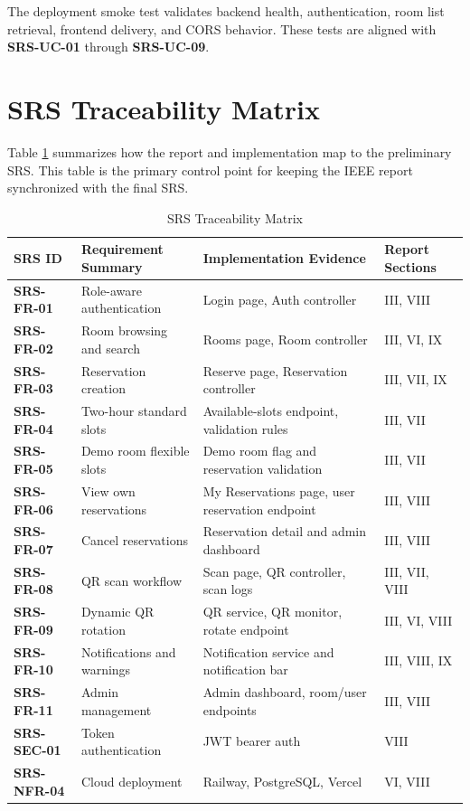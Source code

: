 \documentclass[conference]{IEEEtran}
\newcommand{\srs}[1]{\textbf{#1}}
\begin{document}
The deployment smoke test validates backend health, authentication, room list
retrieval, frontend delivery, and CORS behavior. These tests are aligned with
\srs{SRS-UC-01} through \srs{SRS-UC-09}.

\section{SRS Traceability Matrix}
Table \ref{tab:traceability} summarizes how the report and implementation map
to the preliminary SRS. This table is the primary control point for keeping
the IEEE report synchronized with the final SRS.

\begin{table}[htbp]
\caption{SRS Traceability Matrix}
\label{tab:traceability}
\centering
\begin{tabularx}{\textwidth}{@{}lXlX@{}}
\toprule
\textbf{SRS ID} & \textbf{Requirement Summary} & \textbf{Implementation Evidence} & \textbf{Report Sections} \\
\midrule
\srs{SRS-FR-01} & Role-aware authentication & Login page, Auth controller & III, VIII \\
\srs{SRS-FR-02} & Room browsing and search & Rooms page, Room controller & III, VI, IX \\
\srs{SRS-FR-03} & Reservation creation & Reserve page, Reservation controller & III, VII, IX \\
\srs{SRS-FR-04} & Two-hour standard slots & Available-slots endpoint, validation rules & III, VII \\
\srs{SRS-FR-05} & Demo room flexible slots & Demo room flag and reservation validation & III, VII \\
\srs{SRS-FR-06} & View own reservations & My Reservations page, user reservation endpoint & III, VIII \\
\srs{SRS-FR-07} & Cancel reservations & Reservation detail and admin dashboard & III, VIII \\
\srs{SRS-FR-08} & QR scan workflow & Scan page, QR controller, scan logs & III, VII, VIII \\
\srs{SRS-FR-09} & Dynamic QR rotation & QR service, QR monitor, rotate endpoint & III, VI, VIII \\
\srs{SRS-FR-10} & Notifications and warnings & Notification service and notification bar & III, VIII, IX \\
\srs{SRS-FR-11} & Admin management & Admin dashboard, room/user endpoints & III, VIII \\
\srs{SRS-SEC-01} & Token authentication & JWT bearer auth & VIII \\
\srs{SRS-NFR-04} & Cloud deployment & Railway, PostgreSQL, Vercel & VI, VIII \\
\bottomrule
\end{tabularx}
\end{table}
\end{document}
